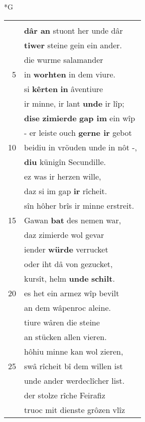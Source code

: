 \documentclass[8pt,a4paper,notitlepage]{article}
\begin{document}
\begin{table}[ht]
\begin{minipage}[t]{0.5\linewidth}
\small
\begin{center}*G
\end{center}
\begin{tabular}{rl}
 & \textbf{\begin{large}H\end{large}ôch} gebildet, snêvar.\\ 
 & \textbf{dâr an} stuont her unde dâr\\ 
 & \textbf{tiwer} steine gein ein ander.\\ 
 & die wurme salamander\\ 
5 & in \textbf{worhten} in dem viure.\\ 
 & si \textbf{kêrten} \textbf{in} âventiure\\ 
 & ir minne, ir lant \textbf{unde} ir lîp;\\ 
 & \textbf{dise} \textbf{zimierde} \textbf{gap im} ein wîp\\ 
 & - er leiste ouch \textbf{gerne ir} gebot\\ 
10 & beidiu in vröuden unde in nôt -,\\ 
 & \textbf{diu} künigîn Secundille.\\ 
 & ez was ir herzen wille,\\ 
 & daz si im gap \textbf{ir} rîcheit.\\ 
 & sîn hôher brîs ir minne erstreit.\\ 
15 & Gawan \textbf{bat} des nemen war,\\ 
 & daz zimierde wol gevar\\ 
 & iender \textbf{würde} verrucket\\ 
 & oder iht dâ von gezucket,\\ 
 & kursît, helm \textbf{unde} \textbf{schilt}.\\ 
20 & es het ein armez wîp bevilt\\ 
 & an dem wâpenroc aleine.\\ 
 & tiure wâren die steine\\ 
 & an stücken allen vieren.\\ 
 & hôhiu minne kan wol zieren,\\ 
25 & swâ rîcheit bî dem willen ist\\ 
 & unde ander werdeclîcher list.\\ 
 & der stolze rîche Feirafiz\\ 
 & truoc mit dienste grôzen vlîz\\ 

\end{tabular}
\end{minipage}
\end{table}
\end{document}
